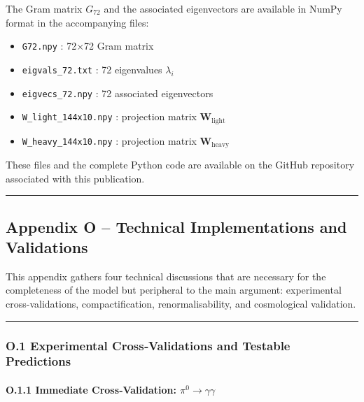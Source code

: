 \documentclass[11pt]{article}
\providecommand{\tightlist}{\setlength{\itemsep}{2pt}\setlength{\parskip}{6pt}}
\providecommand{\tightlist}{%
  \setlength{\itemsep}{2pt}\setlength{\parskip}{6pt}
}
\begin{document}
The Gram matrix \(G_{72}\) and the associated eigenvectors are available
in NumPy format in the accompanying files:

\begin{itemize}
\tightlist
\item
  \texttt{G72.npy} : 72×72 Gram matrix
\item
  \texttt{eigvals\_72.txt} : 72 eigenvalues \(\lambda_i\)
\item
  \texttt{eigvecs\_72.npy} : 72 associated eigenvectors
\item
  \texttt{W\_light\_144x10.npy} : projection matrix
  \(\mathbf{W}_{\text{light}}\)
\item
  \texttt{W\_heavy\_144x10.npy} : projection matrix
  \(\mathbf{W}_{\text{heavy}}\)
\end{itemize}

These files and the complete Python code are available on the GitHub
repository associated with this publication.

\begin{center}\rule{0.5\linewidth}{0.5pt}\end{center}

\hypertarget{appendix-o-technical-implementations-and-validations}{%
\subsection{Appendix O -- Technical Implementations and
Validations}\label{appendix-o-technical-implementations-and-validations}}

This appendix gathers four technical discussions that are necessary for
the completeness of the model but peripheral to the main argument:
experimental cross-validations, compactification, renormalisability, and
cosmological validation.

\begin{center}\rule{0.5\linewidth}{0.5pt}\end{center}

\hypertarget{o.1-experimental-crossvalidations-and-testable-predictions}{%
\subsubsection{O.1 Experimental Cross‑Validations and Testable
Predictions}\label{o.1-experimental-crossvalidations-and-testable-predictions}}

\hypertarget{o.1.1-immediate-crossvalidation-pi0-to-gammagamma}{%
\paragraph{\texorpdfstring{O.1.1 Immediate Cross‑Validation:
\(\pi^0 \to \gamma\gamma\)}{O.1.1 Immediate Cross‑Validation: \textbackslash pi\^{}0 \textbackslash to \textbackslash gamma\textbackslash gamma}}\label{o.1.1-immediate-crossvalidation-pi0-to-gammagamma}}
\end{document}
